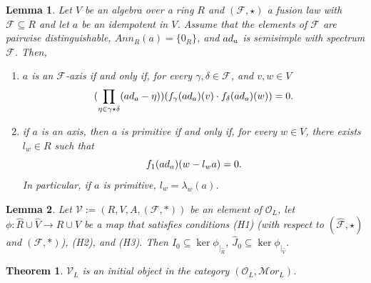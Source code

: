 \documentclass[10pt,a4paper]{amsart}
\newtheorem{lemma}{Lemma}
\newtheorem{theorem}{Theorem}
\newcommand{\So}{{\hat {\mathcal F}}}
\newcommand{\aR}{{\hat R}}
\newcommand{\aV}{{\hat V}}
\newcommand{\ad}{{\rm ad}}
\newcommand{\hJ}{{\hat J}}
\begin{document}
\begin{lemma}\label{condition}
Let $V$ be an algebra over a ring $R$ and $ (\mathcal F, \star)$ a fusion law with $\mathcal F\subseteq R$ and let $a$ be an idempotent in $V$.  Assume that the elements of $\mathcal F$ are pairwise distinguishable, $Ann_R(a)=\{0_R\}$, and $\ad_a$ is semisimple with spectrum $\mathcal F$. Then, 
\begin{enumerate}
\item $a$ is an $\mathcal F$-axis if and only if, for every  $\gamma, \delta\in \mathcal F$, and $v, w\in V$ 
\begin{equation}\label{cond2}
 (\prod_{\eta \in \gamma\star \delta}(\ad_a-\eta )) (f_\gamma(\ad_a)( v) \cdot f_\delta(\ad_a) (w))=0.
\end{equation}
\item if $a$ is an axis, then $a$ is primitive if and only if, for every  $w\in V$, there exists $l_w\in R$ such that
 \begin{equation}\label{cond1}
 f_1(\ad_a)(w-l_w a) =0.
 \end{equation}
In particular, if  $a$ is primitive, $l_w=\lambda_w(a)$.
\end{enumerate}
\end{lemma}

\begin{lemma}\label{contained}
Let ${\mathcal V}:=(R, V, A, (\mathcal F, \ast) )$ be an element of  $\mathcal O_L$, let $\phi\colon \aR\cup\aV  \to R\cup V$ be a map  that satisfies conditions (H1) (with respect to $(\So,\star)$ and $(\mathcal F, \ast)$), (H2), and (H3). Then $I_0\subseteq \ker \phi_{|_{\aR}}$,  $\hJ_0\subseteq  \ker \phi_{|_{\aV}}$. 
\end{lemma}

\begin{theorem}\label{free}
$\mathcal V_L$ is an initial object in the category $({\mathcal O}_L,{\mathcal Mor}_L)$.
\end{theorem}
\end{document}
